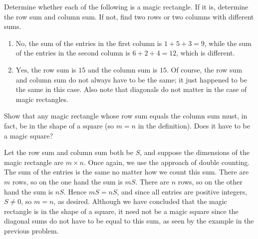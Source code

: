 \documentclass[11pt]{article}
\renewenvironment{problem}{\begin{problems}}{\end{problems}\vspace{5pt}}
\begin{document}
\setcounter{subfigure}{0}
\begin{problem}[4=2+2 points]
Determine whether each of the following is a magic rectangle. If it is, determine the row sum and column sum.
If not, find two rows or two columns with different sums.
\begin{figure}[H]
\centering
{} \qquad \qquad
{}
\end{figure}
\end{problem}

\begin{solution}
\begin{enumerate}[label=(\alph*)]
\item $\boxed{\text{No}}$, the sum of the entries in the first column is $1+5+3=9$, while
the sum of the entries in the second column is $6+2+4 = 12$, which is different.

\item $\boxed{\text{Yes}}$, the row sum is $15$ and the column sum is $15$. Of course, the row sum
and column sum do not always have to be the same; it just happened to be the same in this case.
Also note that diagonals do not matter in the case of magic rectangles.
\end{enumerate}
\end{solution}


\begin{problem}[4 points]
Show that any magic rectangle whose row sum equals the column sum must, in fact, be in the shape of a square
(so $m = n$ in the definition). Does it have to be a magic square?
\end{problem}

\begin{solution}
Let the row sum and column sum both be $S$, and suppose the dimensions of the magic rectangle are $m \times n$. 
Once again, we use the approach of double counting.  The sum of the entries is the same no matter how we count this sum.
There are $m$ rows, so on the one hand the sum is $mS$. There are $n$ rows, so on the other hand the sum is $nS$.
Hence $mS = nS$, and since all entries are positive integers, $S \ne 0$, so $m = n$, as desired.
Although we have concluded that the magic rectangle is in the shape of a square, it need not be a magic
square since the diagonal sums do not have to be equal to this sum, as seen by the example in the previous problem.  
\end{solution}
\end{document}
